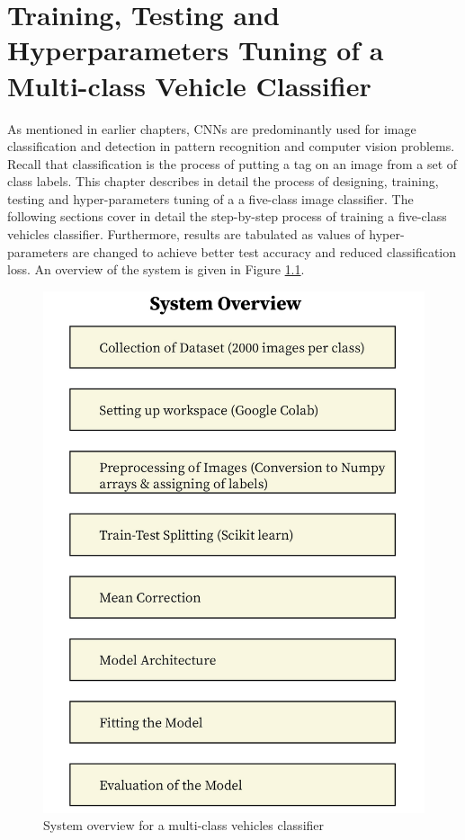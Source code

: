 \chapter{Training, Testing and Hyperparameters Tuning of a Multi-class
Vehicle Classifier}
\label{Chapter 4}
As mentioned in earlier chapters, CNNs are predominantly used for
image classification and detection in pattern recognition and
computer vision problems. Recall that classification is the process of putting a tag on
an image from a set of class labels. This chapter describes in detail
the process of designing, training, testing and hyper-parameters
tuning of a a five-class image classifier. The following sections
cover in detail the step-by-step process of training a five-class vehicles
classifier. Furthermore, results are tabulated as values of
hyper-parameters are changed to achieve better test accuracy and reduced
classification loss. An overview of the system is given in
Figure \ref{system_overview}.

\begin{figure}
    \centering
    \captionsetup{justification = centering}
    \includegraphics[scale = 0.9]{CHAPTERS/Chapter-4/Images/system_overview-01.jpg}
    \caption{System overview for a multi-class vehicles classifier  } 
    \label{system_overview}
  \end{figure}
